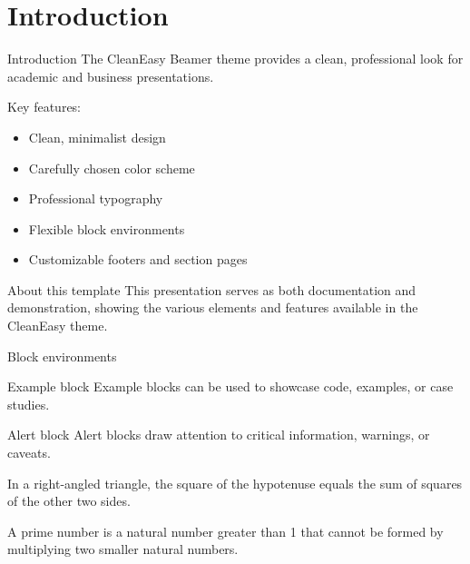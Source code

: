 \documentclass[aspectratio=169,xcolor=dvipsnames]{beamer}
\begin{document}
\begin{frame}[plain]
  \titlepage
\end{frame}


\section{Introduction}
\begin{frame}{Introduction}
  The CleanEasy Beamer theme provides a clean, professional look for academic and business presentations.
  
  \vspace{0.3cm}
  
  Key features:
  \begin{itemize}
    \item Clean, minimalist design
    \item Carefully chosen color scheme
    \item Professional typography
    \item Flexible block environments
    \item Customizable footers and section pages
  \end{itemize}
  
  \begin{block}{About this template}
    This presentation serves as both documentation and demonstration, showing the various elements and features available in the CleanEasy theme.
  \end{block}
\end{frame}

\begin{frame}{Block environments}

  \begin{exampleblock}{Example block}
    Example blocks can be used to showcase code, examples, or case studies.
  \end{exampleblock}
  
  \begin{alertblock}{Alert block}
    Alert blocks draw attention to critical information, warnings, or caveats.
  \end{alertblock}
  
  \begin{theorem}
    In a right-angled triangle, the square of the hypotenuse equals the sum of squares of the other two sides.
  \end{theorem}
  
  \begin{definition}
    A prime number is a natural number greater than 1 that cannot be formed by multiplying two smaller natural numbers.
  \end{definition}
\end{frame}
\end{document}
